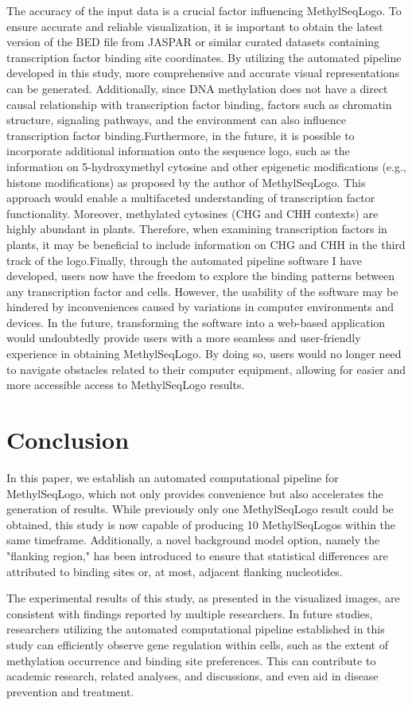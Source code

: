 \documentclass{PHlab-thesis}
\begin{document}
The accuracy of the input data is a crucial factor influencing MethylSeqLogo. To ensure accurate and reliable visualization, it is important to obtain the latest version of the BED file from JASPAR or similar curated datasets containing transcription factor binding site coordinates. By utilizing the automated pipeline developed in this study, more comprehensive and accurate visual representations can be generated. Additionally, since DNA methylation does not have a direct causal relationship with transcription factor binding, factors such as chromatin structure, signaling pathways, and the environment can also influence transcription factor binding.Furthermore, in the future, it is possible to incorporate additional information onto the sequence logo, such as the information on 5-hydroxymethyl cytosine and other epigenetic modifications (e.g., histone modifications) as proposed by the author of MethylSeqLogo. This approach would enable a multifaceted understanding of transcription factor functionality. Moreover, methylated cytosines (CHG and CHH contexts) are highly abundant in plants. Therefore, when examining transcription factors in plants, it may be beneficial to include information on CHG and CHH in the third track of the logo.Finally, through the automated pipeline software I have developed, users now have the freedom to explore the binding patterns between any transcription factor and cells. However, the usability of the software may be hindered by inconveniences caused by variations in computer environments and devices. In the future, transforming the software into a web-based application would undoubtedly provide users with a more seamless and user-friendly experience in obtaining MethylSeqLogo. By doing so, users would no longer need to navigate obstacles related to their computer equipment, allowing for easier and more accessible access to MethylSeqLogo results.
\chapter{Conclusion}
In this paper, we establish an automated computational pipeline for MethylSeqLogo, which not only provides convenience but also accelerates the generation of results. While previously only one MethylSeqLogo result could be obtained, this study is now capable of producing 10 MethylSeqLogos within the same timeframe. Additionally, a novel background model option, namely the "flanking region," has been introduced to ensure that statistical differences are attributed to binding sites or, at most, adjacent flanking nucleotides.

The experimental results of this study, as presented in the visualized images, are consistent with findings reported by multiple researchers. In future studies, researchers utilizing the automated computational pipeline established in this study can efficiently observe gene regulation within cells, such as the extent of methylation occurrence and binding site preferences. This can contribute to academic research, related analyses, and discussions, and even aid in disease prevention and treatment.
\newpage
{}
\printbibliography
\end{document}
